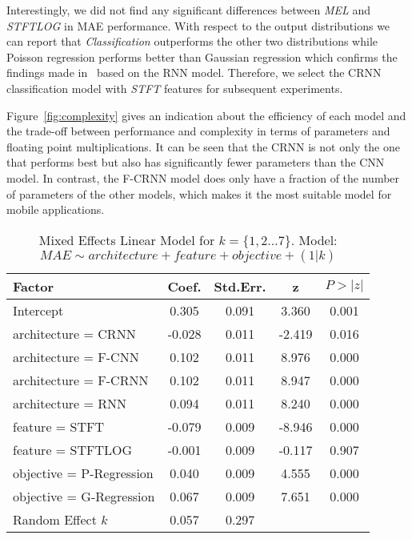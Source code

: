 Interestingly, we did not find any significant differences between \emph{MEL} and \emph{STFTLOG} in MAE performance.
With respect to the output distributions we can report that \emph{Classification} outperforms the other two distributions while Poisson regression performs better than Gaussian regression which confirms the findings made in~\cite{stoeter17} based on the RNN model.
Therefore, we select the CRNN classification model with \emph{STFT} features for subsequent experiments.
\par
Figure~\ref{fig:complexity} gives an indication about the efficiency of each model and the trade-off between performance and complexity in terms of parameters and floating point multiplications.
It can be seen that the CRNN is not only the one that performs best but also has significantly fewer parameters than the CNN model.
In contrast, the F-CRNN model does only have a fraction of the number of parameters of the other models, which makes it the most suitable model for mobile applications.

\begin{table}[b]
\caption{Mixed Effects Linear Model for \(k = \{1, 2\dots7\}\). Model: \(MAE \sim architecture + feature + objective + (1|k)\)}
\begin{center}
\begin{tabular}{lcccc}
\toprule
Factor                    & Coef.  & Std.Err. &   z    & \(P>|z|\) \\
\midrule
Intercept                      &  0.305 &    0.091 &  3.360 &       0.001 \\
architecture = CRNN            & -0.028 &    0.011 & -2.419 &       0.016 \\
architecture = F-CNN           &  0.102 &    0.011 &  8.976 &       0.000 \\
architecture = F-CRNN          &  0.102 &    0.011 &  8.947 &       0.000 \\
architecture = RNN             &  0.094 &    0.011 &  8.240 &       0.000 \\
feature = STFT                 & -0.079 &    0.009 & -8.946 &       0.000 \\
feature = STFTLOG              & -0.001 &    0.009 & -0.117 &       0.907 \\
objective = P-Regression       &  0.040 &    0.009 &  4.555 &       0.000 \\
objective = G-Regression       &  0.067 &    0.009 &  7.651 &       0.000 \\
Random Effect \(k\)            &  0.057 &    0.297 &        &             \\
\bottomrule
\end{tabular}
\end{center}%
\label{tab:mixedmodel1}
\end{table}


